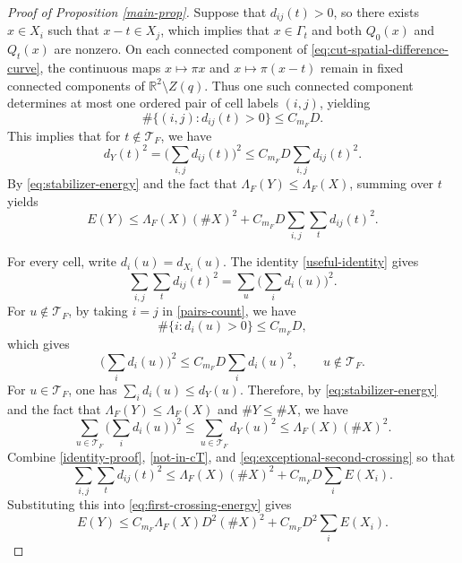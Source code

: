 \documentclass{amsart}%
\numberwithin{equation}{section}
\newcommand{\cT}{{\mathcal T}}
\newcommand{\R}{\mathbb{R}}
\newcommand{\1}{\mathbbm{1}}
\begin{document}
\begin{proof}[Proof of Proposition \ref{main-prop}]
Suppose that $d_{ij}(t)>0$, so there exists $x\in X_i$ such that $x-t\in X_j$, which implies that $x\in\Gamma_t$ and both $Q_0(x)$ and $Q_t(x)$ are nonzero. 
On each connected component of \eqref{eq:cut-spatial-difference-curve}, the continuous maps
$x\mapsto\pi x$ and $x\mapsto\pi(x-t)$ remain in fixed connected components of $\R^2\setminus Z(q)$.  
Thus one such connected component determines at most one ordered pair of cell labels $(i,j)$, yielding
\begin{equation}
\label{pairs-count}
    \#\{(i,j):d_{ij}(t)>0\}\leq C_{m_F}D.
\end{equation}
This implies that for $t\notin\mathcal T_F$, we have
\begin{equation}
\nonumber
    d_Y(t)^2 =\Big(\sum_{i,j}d_{ij}(t)\Big)^2\leq C_{m_F}D\sum_{i,j}d_{ij}(t)^2.
\end{equation}
By \eqref{eq:stabilizer-energy} and the fact that $\Lambda_{F}(Y)\leq\Lambda_F(X)$, summing over $t$ yields
\begin{equation}
\label{eq:first-crossing-energy}
    E(Y)\leq\Lambda_{F}(X) (\#X)^2
    +C_{m_F}D\sum_{i,j}\sum_t d_{ij}(t)^2.
\end{equation}

\medskip



For every cell, write $d_i(u)=d_{X_i}(u)$. 
The identity \eqref{useful-identity} gives
\begin{equation}
\label{identity-proof}
    \sum_{i,j}\sum_t d_{ij}(t)^2=\sum_u\Big(\sum_i d_i(u)\Big)^2.
\end{equation}
For $u\notin\mathcal T_F$, by taking $i=j$ in \eqref{pairs-count}, we have
\begin{equation}
\nonumber
    \#\{i:d_i(u)>0\}\leq C_{m_F}D,
\end{equation}
which gives
\begin{equation}
\label{not-in-cT}
    \Big(\sum_i d_i(u)\Big)^2\leq C_{m_F}D\sum_i d_i(u)^2, \qquad u\not\in \cT_F. 
\end{equation}
For $u\in\mathcal T_F$, one has
$\sum_i d_i(u)\leq d_Y(u)$.  
Therefore, by \eqref{eq:stabilizer-energy} and the fact that $\Lambda_{F}(Y)\leq\Lambda_F(X)$ and $\#Y\leq \#X$, we have
\begin{equation}
\label{eq:exceptional-second-crossing}
    \sum_{u\in\mathcal T_F}
    \Big(\sum_i d_i(u)\Big)^2
    \leq\sum_{u\in\mathcal T_F}d_Y(u)^2
    \leq\Lambda_{F}(X)(\#X)^2.
\end{equation}
Combine \eqref{identity-proof}, \eqref{not-in-cT}, and
\eqref{eq:exceptional-second-crossing} so that
\begin{equation}
\nonumber
    \sum_{i,j}\sum_t d_{ij}(t)^2\leq\Lambda_{F}(X)(\#X)^2+C_{m_F}D\sum_iE(X_i).
\end{equation}
Substituting this into \eqref{eq:first-crossing-energy} gives
\begin{equation}
\label{eq:off-wall}
    E(Y)
    \leq C_{m_F}\Lambda_{F}(X)D^2(\#X)^2
    +C_{m_F}D^2\sum_iE(X_i).
\end{equation}


\end{proof}
\end{document}
